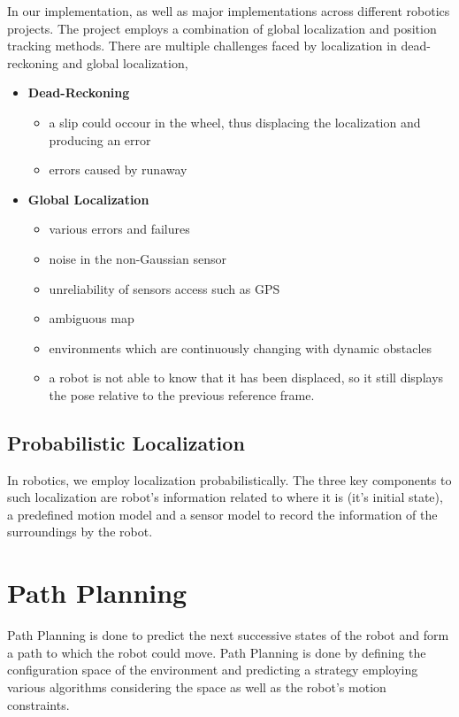 In our implementation, as well as major implementations across different robotics projects. The project employs a combination of global localization and position tracking methods.
There are multiple challenges faced by localization in dead-reckoning and global localization,
\begin{itemize}
    \item \textbf{Dead-Reckoning} \begin{itemize} \item a slip could occour in the wheel, thus displacing the localization and producing an error \item errors caused by runaway \end{itemize}
    \item \textbf{Global Localization} \begin{itemize} \item various errors and failures \item noise in the non-Gaussian sensor \item unreliability of sensors access such as GPS \item ambiguous map \item environments which are continuously changing with dynamic obstacles \item a robot is not able to know that it has been displaced, so it still displays the pose relative to the previous reference frame.  \end{itemize}
\end{itemize}
\subsection{Probabilistic Localization}
In robotics, we employ localization probabilistically. The three key components to such localization are robot's information related to where it is (it's initial state), a predefined motion model and a sensor model to record the information of the surroundings by the robot.


\section{Path Planning}
Path Planning is done to predict the next successive states of the robot and form a path to which the robot could move. Path Planning is done by defining the configuration space of the environment and predicting a strategy employing various algorithms considering the space as well as the robot's motion constraints.


